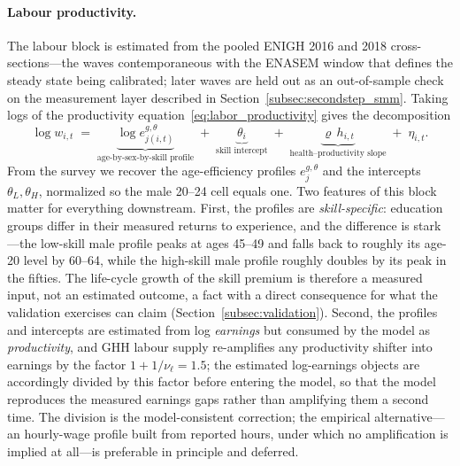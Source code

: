 \documentclass[12pt,a4paper]{article}
\begin{document}
\paragraph{Labour productivity.}
The labour block is estimated from the pooled ENIGH 2016 and 2018 cross-sections---the waves contemporaneous with the ENASEM window that defines the steady state being calibrated; later waves are held out as an out-of-sample check on the measurement layer described in Section~\ref{subsec:secondstep_smm}. Taking logs of the productivity equation~\eqref{eq:labor_productivity} gives the decomposition
\begin{equation}
\label{eq:logwage_decomp}
\log w_{i,t} \;=\; \underbrace{\log e^{g,\theta}_{j(i,t)}}_{\text{age-by-sex-by-skill profile}} \;+\; \underbrace{\theta_{i}}_{\text{skill intercept}} \;+\; \underbrace{\varrho\, h_{i,t}}_{\text{health--productivity slope}} \;+\; \eta_{i,t}.
\end{equation}
From the survey we recover the age-efficiency profiles $e^{g,\theta}_j$ and the intercepts $\theta_L,\theta_H$, normalized so the male 20--24 cell equals one. Two features of this block matter for everything downstream. First, the profiles are \emph{skill-specific}: education groups differ in their measured returns to experience, and the difference is stark---the low-skill male profile peaks at ages 45--49 and falls back to roughly its age-20 level by 60--64, while the high-skill male profile roughly doubles by its peak in the fifties. The life-cycle growth of the skill premium is therefore a measured input, not an estimated outcome, a fact with a direct consequence for what the validation exercises can claim (Section~\ref{subsec:validation}). Second, the profiles and intercepts are estimated from log \emph{earnings} but consumed by the model as \emph{productivity}, and GHH labour supply re-amplifies any productivity shifter into earnings by the factor $1+1/\nu_\ell = 1.5$; the estimated log-earnings objects are accordingly divided by this factor before entering the model, so that the model reproduces the measured earnings gaps rather than amplifying them a second time. The division is the model-consistent correction; the empirical alternative---an hourly-wage profile built from reported hours, under which no amplification is implied at all---is preferable in principle and deferred.
\end{document}
